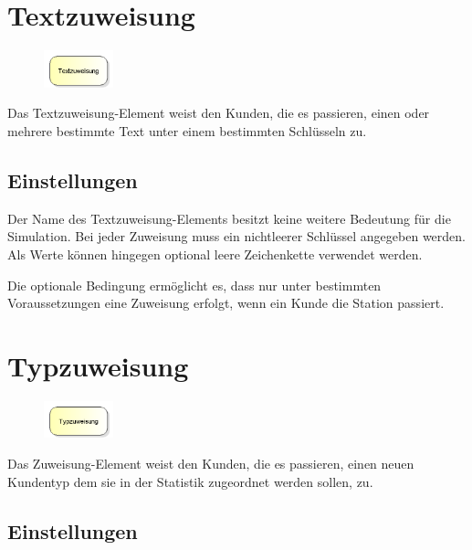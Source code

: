 \section{Textzuweisung}
\label{ref:ModelElementAssignString}

\begin{figure}
\vspace{-22pt}
\includegraphics[width=2cm]{imageModelElementAssignString.png}
\vspace{-22pt}
\end{figure}

Das Textzuweisung-Element weist den Kunden, die es passieren, einen oder mehrere bestimmte Text
unter einem bestimmten Schlüsseln zu.

\subsection*{Einstellungen}

Der Name des Textzuweisung-Elements besitzt keine weitere Bedeutung für die Simulation. Bei jeder
Zuweisung muss ein nichtleerer Schlüssel angegeben werden. Als Werte können hingegen optional
leere Zeichenkette verwendet werden.

Die optionale Bedingung ermöglicht es, dass nur unter bestimmten Voraussetzungen eine Zuweisung erfolgt,
wenn ein Kunde die Station passiert.


\section{Typzuweisung}
\label{ref:ModelElementAssign}

\begin{figure}
\vspace{-22pt}
\includegraphics[width=2cm]{imageModelElementAssign.png}
\vspace{-22pt}
\end{figure}

Das Zuweisung-Element weist den Kunden, die es passieren, einen neuen Kundentyp dem sie in der Statistik zugeordnet werden sollen, zu.

\subsection*{Einstellungen}

